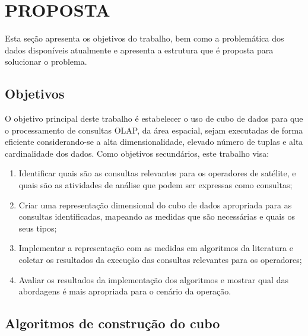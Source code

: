 
\chapter{PROPOSTA}\label{ch:prop}

{\color{cerulean}
Esta seção apresenta os objetivos do trabalho, bem como a problemática dos dados disponíveis atualmente e apresenta a estrutura que é proposta para solucionar o problema.
}

\section{Objetivos}\label{ch:prop:obj}

{\color{red}

O objetivo principal deste trabalho é estabelecer o uso de cubo de dados para que o processamento de consultas OLAP, da área espacial, sejam executadas de forma eficiente considerando-se a alta dimensionalidade, elevado número de tuplas e alta cardinalidade dos dados.
Como objetivos secundários, este trabalho visa:

\begin{enumerate}
\item Identificar quais são as consultas relevantes para os operadores de satélite, e quais são as atividades de análise que podem ser expressas como consultas;
\item Criar uma representação dimensional do cubo de dados apropriada para as consultas identificadas, mapeando as medidas que são necessárias e quais os seus tipos;
\item Implementar a representação com as medidas em algoritmos da literatura e coletar os resultados da execução das consultas relevantes para os operadores;
\item Avaliar os resultados da implementação dos algoritmos e mostrar qual das abordagens é mais apropriada para o cenário da operação.
\end{enumerate}

}

\section{Algoritmos de construção do cubo}\label{ch:prop:cube}

